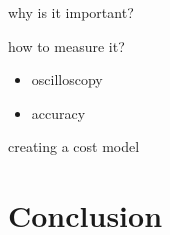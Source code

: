 \documentclass[presentation]{beamer}
\begin{document}
\begin{frame}[label=sec-3-1]{why is it important?}
\end{frame}
\begin{frame}[label=sec-3-2]{how to measure it?}
\begin{itemize}
\item oscilloscopy
\item accuracy
\end{itemize}
\end{frame}

\begin{frame}[label=sec-3-3]{creating a cost model}
\end{frame}
\section{Conclusion}
\label{sec-4}
\end{document}

